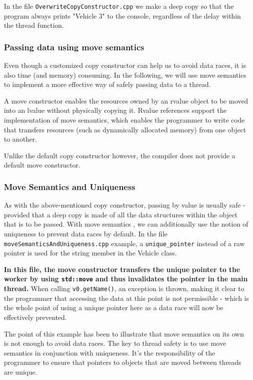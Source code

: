 \documentclass[11pt, a4paper]{article}
\begin{document}
In the file \texttt{OverwriteCopyConstructor.cpp} we make a deep copy so that the program always prints "Vehicle 3" to the console, regardless of the delay within the thread function.





\subsubsection{Passing data using move semantics}%
\label{ssub:passing_data_using_move_semantics}

Even though a customized copy constructor can help us to avoid data races, it is also time (and memory) consuming. In the following, we will use move semantics to implement a more effective way of safely passing data to a thread.

A move constructor enables the resources owned by an rvalue object to be moved into an lvalue without physically copying it. Rvalue references support the implementation of move semantics, which enables the programmer to write code that transfers resources (such as dynamically allocated memory) from one object to another.

Unlike the default copy constructor however, the compiler does not provide a default move constructor. 


\subsubsection{Move Semantics and Uniqueness}%
\label{ssub:move_semantics_and_uniqueness}

As with the above-mentioned copy constructor, passing by value is usually safe - provided that a deep copy is made of all the data structures within the object that is to be passed. With move semantics , we can additionally use the notion of uniqueness to prevent data races by default. In the file \texttt{moveSemanticsAndUniqueness.cpp}  example, a \texttt{unique\_pointer} instead of a raw pointer is used for the string member in the Vehicle class.


\textbf{In this file, the move constructor transfers the unique pointer to the worker by using \texttt{std::move}  and thus invalidates the pointer in the main thread.} When calling \texttt{v0.getName()}, an exception is thrown, making it clear to the programmer that accessing the data at this point is not permissible - which is the whole point of using a unique pointer here as a data race will now be effectively prevented. 

The point of this example has been to illustrate that move semantics on its own is not enough to avoid data races. The key to thread safety is to use move semantics in conjunction with uniqueness. It's the responsibility of the programmer to ensure that pointers to objects that are moved between threads are unique.
\end{document}
